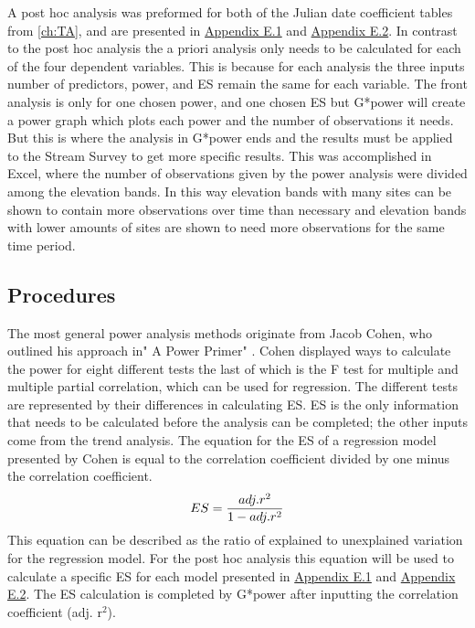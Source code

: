 A post hoc analysis was preformed for both of the Julian date coefficient tables from \autoref{ch:TA}, and are presented in \hyperref[sec:SWPHPA]{Appendix E.1} and \hyperref[sec:TVPHPA]{Appendix E.2}.
In contrast to the post hoc analysis the a priori analysis only needs to be calculated for each of the four dependent variables.
This is because for each analysis the three inputs number of predictors, power, and ES remain the same for each variable.
The front analysis is only for one chosen power, and one chosen ES but G*power will create a power graph which plots each power and the number of observations it needs.
But this is where the analysis in G*power ends and the results must be applied to the Stream Survey to get more specific results.
This was accomplished in Excel, where the number of observations given by the power analysis were divided among the elevation bands.
In this way elevation bands with many sites can be shown to contain more observations over time than necessary and elevation bands with lower amounts of sites are shown to need more observations for the same time period.

\subsection{Procedures}

The most general power analysis methods originate from Jacob Cohen, who outlined his approach in" A Power Primer" \citep{cohen1992power}.
Cohen displayed ways to calculate the power for eight different tests the last of which is the F test for multiple and multiple partial correlation, which can be used for regression.
The different tests are represented by their differences in calculating ES.
ES is the only information that needs to be calculated before the analysis can be completed; the other inputs come from the trend analysis.
The equation for the ES of a regression model presented by Cohen is equal to the correlation coefficient divided by one minus the correlation coefficient.
\begin{equation} \label{eq:ES}
    ES = {adj. r^2 \over {1-adj. r^2}}
\end{equation}
This equation can be described as the ratio of explained to unexplained variation for the regression model.
For the post hoc analysis this equation will be used to calculate a specific ES for each model presented in \hyperref[sec:SWPHPA]{Appendix E.1} and \hyperref[sec:TVPHPA]{Appendix E.2}.
The ES calculation is completed by G*power after inputting the correlation coefficient (adj. r$^2$).

